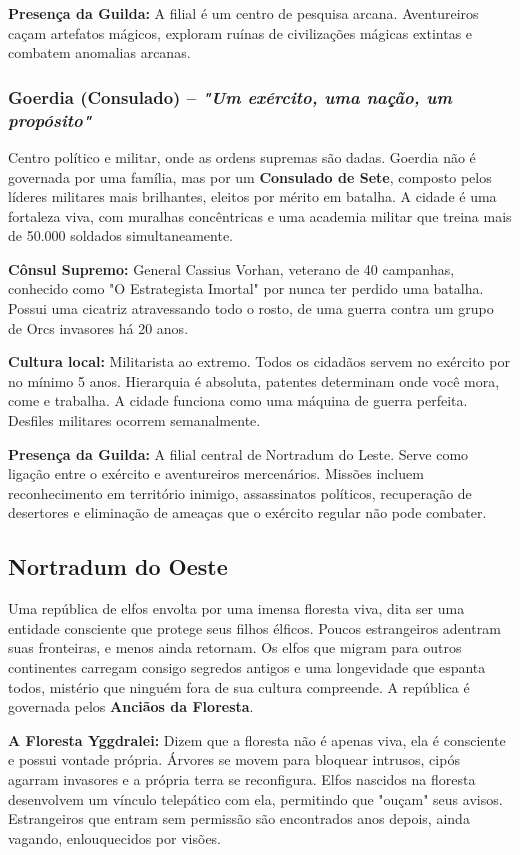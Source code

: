 \textbf{\ringmfamily Presença da Guilda:} A filial é um centro de pesquisa arcana. Aventureiros caçam artefatos mágicos, exploram ruínas de civilizações mágicas extintas e combatem anomalias arcanas.

\subsubsection*{Goerdia (Consulado) – \textit{"Um exército, uma nação, um propósito"}}
Centro político e militar, onde as ordens supremas são dadas. Goerdia não é governada por uma família, mas por um \textbf{Consulado de Sete}, composto pelos líderes militares mais brilhantes, eleitos por mérito em batalha. A cidade é uma fortaleza viva, com muralhas concêntricas e uma academia militar que treina mais de 50.000 soldados simultaneamente.

\textbf{\ringmfamily Cônsul Supremo:} General Cassius Vorhan, veterano de 40 campanhas, conhecido como "O Estrategista Imortal" por nunca ter perdido uma batalha. Possui uma cicatriz atravessando todo o rosto, de uma guerra contra um grupo de Orcs invasores há 20 anos.

\textbf{\ringmfamily Cultura local:} Militarista ao extremo. Todos os cidadãos servem no exército por no mínimo 5 anos. Hierarquia é absoluta, patentes determinam onde você mora, come e trabalha. A cidade funciona como uma máquina de guerra perfeita. Desfiles militares ocorrem semanalmente.

\textbf{\ringmfamily Presença da Guilda:} A filial central de Nortradum do Leste. Serve como ligação entre o exército e aventureiros mercenários. Missões incluem reconhecimento em território inimigo, assassinatos políticos, recuperação de desertores e eliminação de ameaças que o exército regular não pode combater.

\subsection*{Nortradum do Oeste}
Uma república de elfos envolta por uma imensa floresta viva, dita ser uma entidade consciente que protege seus filhos élficos. Poucos estrangeiros adentram suas fronteiras, e menos ainda retornam. Os elfos que migram para outros continentes carregam consigo segredos antigos e uma longevidade que espanta todos, mistério que ninguém fora de sua cultura compreende. A república é governada pelos \textbf{Anciãos da Floresta}.

\textbf{\ringmfamily A Floresta Yggdralei:} Dizem que a floresta não é apenas viva, ela é consciente e possui vontade própria. Árvores se movem para bloquear intrusos, cipós agarram invasores e a própria terra se reconfigura. Elfos nascidos na floresta desenvolvem um vínculo telepático com ela, permitindo que "ouçam" seus avisos. Estrangeiros que entram sem permissão são encontrados anos depois, ainda vagando, enlouquecidos por visões.

